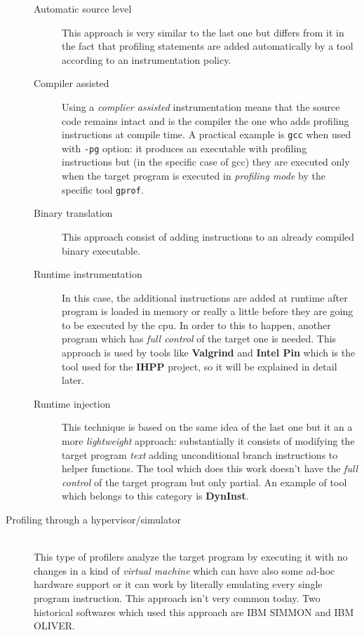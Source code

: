 \documentclass[a4paper,11pt]{report}
\begin{document}
\begin{description}
\begin{description}
\item[Automatic source level]
This approach is very similar to the last one but differs from it in the fact that profiling statements are added automatically by a tool according to an instrumentation policy.

\item[Compiler assisted]
Using a \emph{complier assisted} instrumentation means that the source code remains intact and is the compiler the one who adds profiling instructions at compile time. A practical example is \verb|gcc| when used with \verb|-pg| option: it produces an executable with profiling instructions but (in the specific case of gcc) they are executed only when the target program is executed in \emph{profiling mode} by the specific tool \verb|gprof|.

\item[Binary translation]
This approach consist of adding instructions to an already compiled binary executable.

\item[Runtime instrumentation]
In this case, the additional instructions are added at runtime after program is loaded in memory or really a little before 
they are going to be executed by the cpu. In order to this to happen, another program which has \emph{full control} of the target one is needed. This approach is used by tools like \textbf{Valgrind} and \textbf{Intel Pin} which is the tool used for the \textbf{IHPP} project, so it will be explained in detail later.

\item[Runtime injection]
This technique is based on the same idea of the last one but it an a more \emph{lightweight} approach: substantially it consists of modifying the target program \emph{text} adding unconditional branch instructions to helper functions. The tool which does this work doesn't have the \emph{full control} of the target program but only partial. An example of tool which belongs to this category is \textbf{DynInst}.

\end{description} 

\item[Profiling through a hypervisor/simulator] \hfill \\
This type of profilers analyze the target program by executing it with no changes in a kind of \emph{virtual machine} which can have also some ad-hoc hardware support or it can work by literally emulating every single program instruction. This approach isn't very common today. Two historical softwares which used this approach are IBM SIMMON and IBM OLIVER.

\end{description}
\end{document}
